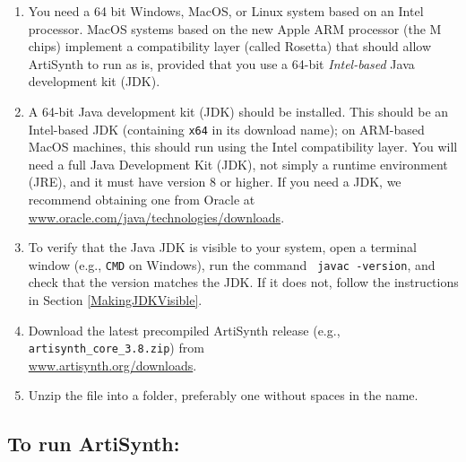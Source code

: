 \documentclass{article}
\begin{document}
\begin{enumerate}

\item You need a 64 bit Windows, MacOS, or Linux system based on an Intel
processor. MacOS systems based on the new Apple ARM processor (the M
chips) implement a compatibility layer (called Rosetta) that should allow
ArtiSynth to run as is, provided that you use a 64-bit {\it Intel-based} Java
development kit (JDK).

\item A 64-bit Java development kit (JDK) should be installed. This should be
an Intel-based JDK (containing {\tt x64} in its download name); on ARM-based
MacOS machines, this should run using the Intel compatibility layer.
You will need a full Java Development Kit (JDK), not simply a runtime
environment (JRE), and it must have version 8 or higher. If you need
a JDK, we recommend obtaining one from Oracle at
\href{https://www.oracle.com/java/technologies/downloads/}%
{www.oracle.com/java/technologies/downloads}.
 
\item To verify that the Java JDK is visible to your system, open a
terminal window (e.g., {\tt CMD} on Windows), run the command {\tt
javac -version}, and check that the version matches the JDK.  If it
does not, follow the instructions in Section
\ref{MakingJDKVisible}.

\item Download the latest precompiled ArtiSynth release 
(e.g., {\tt artisynth\_core\_3.8.zip}) from
\iflatexml\else\\\fi %
\href{https://www.artisynth.org/downloads}{www.artisynth.org/downloads}.
 
\item Unzip the file into a folder, preferably one without spaces in the
name.

\end{enumerate}
 
\subsection{To run ArtiSynth:}
\end{document}
